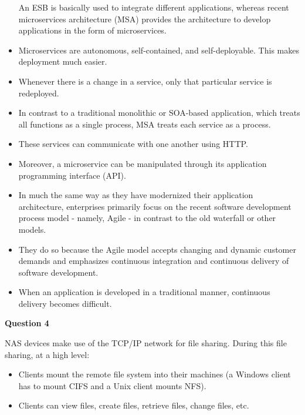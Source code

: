 \documentclass[a4paper, 12pt]{article}
\begin{document}
\begin{itemize}
An ESB is basically used to integrate different applications, whereas recent microservices architecture (MSA) provides the architecture to develop applications in the form of microservices.
\item
Microservices are autonomous, self-contained, and self-deployable. This makes deployment much easier.
\item
Whenever there is a change in a service, only that particular service is redeployed.
\item
In contrast to a traditional monolithic or SOA-based application, which treats all functions as a single process, MSA treats each service as a process. 
\item
These services can communicate with one another using HTTP.
\item
Moreover, a microservice can be manipulated through its application programming interface (API).
\item
In much the same way as they have modernized their application architecture, enterprises primarily focus on the recent software development process model - namely, Agile - in contrast to the old waterfall or other models.
\item
They do so because the Agile model accepts changing and dynamic customer demands and emphasizes continuous integration and continuous delivery of software development.
\item
When an application is developed in a traditional manner, continuous delivery becomes difficult.
\end{itemize}
  

\newpage
\begin{center}
\textbf{Question 4}
\end{center}

NAS devices make use of the TCP/IP network for file sharing. During this file sharing, at a high level:
\begin{itemize}
\item
Clients mount the remote file system into their machines (a Windows client has to mount CIFS and a Unix client mounts NFS).
\item
Clients can view files, create files, retrieve files, change files, etc.
\end{itemize}
\end{document}
